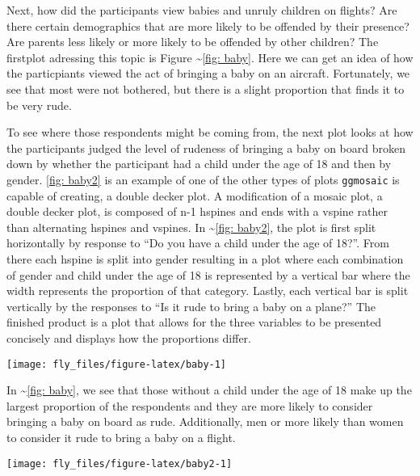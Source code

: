Next, how did the participants view babies and unruly children on
flights? Are there certain demographics that are more likely to be
offended by their presence? Are parents less likely or more likely to be
offended by other children? The firstplot adressing this topic is Figure
\textasciitilde{}\ref{fig: baby}. Here we can get an idea of how the
particpiants viewed the act of bringing a baby on an aircraft.
Fortunately, we see that most were not bothered, but there is a slight
proportion that finds it to be very rude.

To see where those respondents might be coming from, the next plot looks
at how the participants judged the level of rudeness of bringing a baby
on board broken down by whether the participant had a child under the
age of 18 and then by gender. \ref{fig: baby2} is an example of one of
the other types of plots \texttt{ggmosaic} is capable of creating, a
double decker plot. A modification of a mosaic plot, a double decker
plot, is composed of n-1 hspines and ends with a vspine rather than
alternating hspines and vspines. In \textasciitilde{}\ref{fig: baby2},
the plot is first split horizontally by response to ``Do you have a
child under the age of 18?''. From there each hspine is split into
gender resulting in a plot where each combination of gender and child
under the age of 18 is represented by a vertical bar where the width
represents the proportion of that category. Lastly, each vertical bar is
split vertically by the responses to ``Is it rude to bring a baby on a
plane?'' The finished product is a plot that allows for the three
variables to be presented concisely and displays how the proportions
differ.

\begin{Schunk}


\begin{center}\texttt{[image: fly\_files/figure-latex/baby-1]} \end{center}

\end{Schunk}

In \textasciitilde{}\ref{fig: baby}, we see that those without a child
under the age of 18 make up the largest proportion of the respondents
and they are more likely to consider bringing a baby on board as rude.
Additionally, men or more likely than women to consider it rude to bring
a baby on a flight.

\begin{Schunk}


\begin{center}\texttt{[image: fly\_files/figure-latex/baby2-1]} \end{center}

\end{Schunk}

